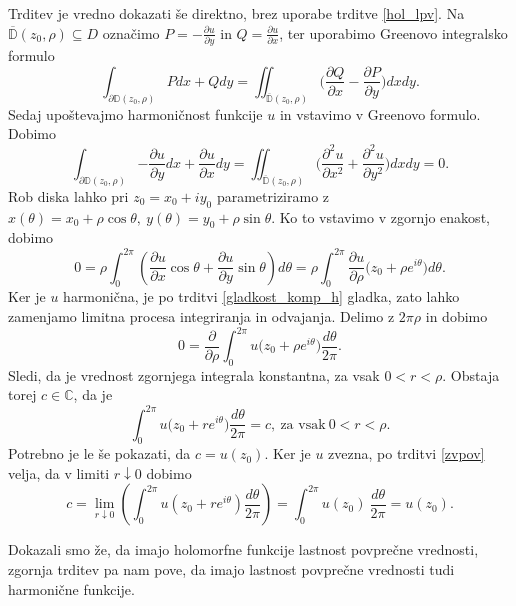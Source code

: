\documentclass[mat1, tisk]{fmfdelo}
\begin{document}
\begin{dokaz}
        Trditev je vredno dokazati še direktno, brez uporabe trditve \ref{hol_lpv}.
        Na $\overline{\mathbb{D}}(z_0, \rho) \subseteq D$ označimo $P = -\frac{\partial u}{\partial y}$ in $Q = \frac{\partial u}{\partial x}$, ter uporabimo Greenovo integralsko formulo
        $$
            \int_{\partial \mathbb{D}(z_0, \rho)}{P dx + Q dy} = \iint_{\overline{\mathbb{D}}(z_0, \rho)}{\bigg(\frac{\partial Q}{\partial x} - \frac{\partial P}{\partial y}\bigg)dx dy}.
        $$ 
        Sedaj upoštevajmo harmoničnost funkcije $u$ in vstavimo v Greenovo formulo. Dobimo
        $$
        \int_{\partial \mathbb{D}(z_0, \rho)}{-\frac{\partial u}{\partial y} dx + \frac{\partial u}{\partial x} dy} = \iint_{\overline{\mathbb{D}}(z_0, \rho)}{\bigg(\frac{\partial^2 u}{\partial x^2} + \frac{\partial^2 u}{\partial y^2}\bigg)dx dy} = 0. 
        $$
        Rob diska lahko pri $z_0 = x_0 + iy_0$ parametriziramo z $x(\theta) = x_0 + \rho \cos\theta,~y(\theta) = y_0 + \rho \sin\theta$. Ko to vstavimo v zgornjo enakost, dobimo
        $$
        0 = \rho \int_{0}^{2 \pi}{\left(\frac{\partial u}{\partial x} \cos\theta + \frac{\partial u}{\partial y} \sin\theta\right) d\theta} = \rho \int_{0}^{2\pi}{\frac{\partial u}{\partial \rho}\big(z_0 + \rho e^{i\theta}\big)d\theta}.
        $$
        Ker je $u$ harmonična, je po trditvi \ref{gladkost_komp_h} gladka, zato lahko zamenjamo limitna procesa integriranja in odvajanja. Delimo z $2\pi \rho$ in dobimo
        $$
        0 = \frac{\partial}{\partial \rho} \int_{0}^{2\pi}{u\big(z_0 + \rho e^{i\theta}\big)\frac{d\theta}{2 \pi}}.
        $$
        Sledi, da je vrednost zgornjega integrala konstantna, za vsak $0 <r < \rho$. Obstaja torej $c \in \mathbb{C}$, da je
        $$
        \int_{0}^{2\pi}{u\big(z_0 + r e^{i\theta}\big)\frac{d\theta}{2 \pi}} = c,~\text{za vsak}~ 0 < r < \rho.
        $$
        Potrebno je le še pokazati, da $c = u(z_0)$.
        Ker je $u$ zvezna, po trditvi \ref{zvpov} velja, da v limiti $r \downarrow 0$ dobimo
        $$
        c = \lim_{r \downarrow 0}{\left(\int_{0}^{2\pi}{u\left(z_0 + r e^{i\theta}\right)\frac{d\theta}{2 \pi}}\right)} = \int_{0}^{2\pi}{{u(z_0)~\frac{d\theta}{2 \pi}}} = u(z_0).
        $$
    \end{dokaz}

    \begin{opomba}
        Dokazali smo že, da imajo holomorfne funkcije lastnost povprečne vrednosti, zgornja trditev pa nam pove, da imajo lastnost povprečne vrednosti tudi harmonične funkcije. 
    \end{opomba}
\end{document}
